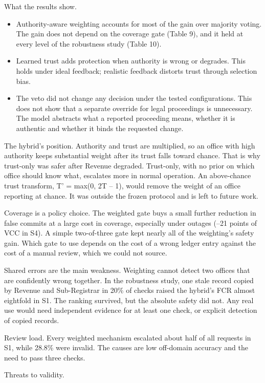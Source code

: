 \documentclass[10pt]{article}
\begin{document}
What the results show.

\begin{itemize}
\item Authority-aware weighting accounts for most of the gain over majority voting. The gain does not depend on the coverage gate (Table 9), and it held at every level of the robustness study (Table 10).
\item Learned trust adds protection when authority is wrong or degrades. This holds under ideal feedback; realistic feedback distorts trust through selection bias.
\item The veto did not change any decision under the tested configurations. This does not show that a separate override for legal proceedings is unnecessary. The model abstracts what a reported proceeding means, whether it is authentic and whether it binds the requested change.
\end{itemize}
The hybrid's position. Authority and trust are multiplied, so an office with high authority keeps substantial weight after its trust falls toward chance. That is why trust-only was safer after Revenue degraded. Trust-only, with no prior on which office should know what, escalates more in normal operation. An above-chance trust transform, T' = max(0, 2T -- 1), would remove the weight of an office reporting at chance. It was outside the frozen protocol and is left to future work.

Coverage is a policy choice. The weighted gate buys a small further reduction in false commits at a large cost in coverage, especially under outages (--21 points of VCC in S4). A simple two-of-three gate kept nearly all of the weighting's safety gain. Which gate to use depends on the cost of a wrong ledger entry against the cost of a manual review, which we could not source.

Shared errors are the main weakness. Weighting cannot detect two offices that are confidently wrong together. In the robustness study, one stale record copied by Revenue and Sub-Registrar in 20\% of checks raised the hybrid's FCR almost eightfold in S1. The ranking survived, but the absolute safety did not. Any real use would need independent evidence for at least one check, or explicit detection of copied records.

Review load. Every weighted mechanism escalated about half of all requests in S1, while 28.8\% were invalid. The causes are low off-domain accuracy and the need to pass three checks.

Threats to validity.
\end{document}

